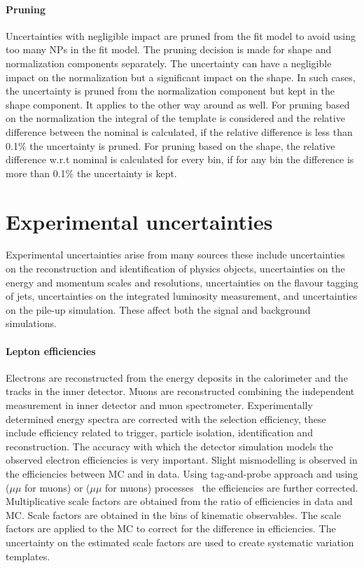 \paragraph{Pruning}Uncertainties with negligible impact are pruned from the fit model to avoid using too many NPs in the fit model. The pruning decision is made for shape and normalization components separately. The uncertainty can have a negligible impact on the normalization but a significant impact on the shape. In such cases, the uncertainty is pruned from the normalization component but kept in the shape component. It applies to the other way around as well. For pruning based on the normalization the integral of the template is considered and the relative difference between the nominal is calculated, if the relative difference is less than 0.1\% the uncertainty is pruned. For pruning based on the shape, the relative difference w.r.t nominal is calculated for every bin, if for any bin the difference is more than 0.1\% the uncertainty is kept.


\section{Experimental uncertainties}
\label{sec:experimental_uncertainties}
Experimental uncertainties arise from many sources these include uncertainties on the reconstruction and identification of physics objects, uncertainties on the energy and momentum scales and resolutions, uncertainties on the flavour tagging of jets, uncertainties on the integrated luminosity measurement, and uncertainties on the pile-up simulation. These affect both the signal and background simulations. 

\paragraph{Lepton efficiencies}
Electrons are reconstructed from the energy deposits in the calorimeter and the tracks in the inner detector. Muons are reconstructed combining the independent measurement in inner detector and muon spectrometer. Experimentally determined energy spectra are corrected with the selection efficiency, these include efficiency related to trigger, particle isolation, identification and reconstruction. The accuracy with which the detector simulation models the observed electron efficiencies is very important. Slight mismodelling is observed in the efficiencies between MC and in data. Using tag-and-probe approach and using \zee($\mu\mu$ for muons)  or \jpsiee($\mu\mu$ for muons) processes~\cite{ATLAS:2019jvq,ATLAS:2016lqx} the efficiencies are further corrected. Multiplicative scale factors are obtained from the ratio of efficiencies in data and MC. Scale factors are obtained in the bins of kinematic observables. The scale factors are applied to the MC to correct for the difference in efficiencies. The uncertainty on the estimated scale factors are used to create systematic variation templates.

